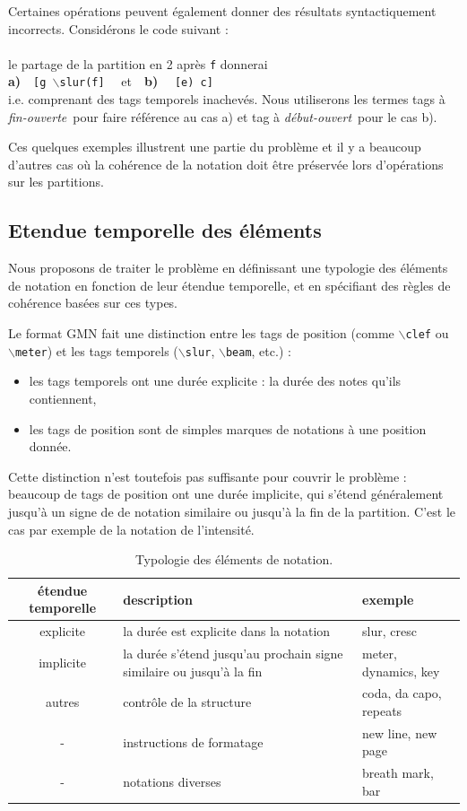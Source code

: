\documentclass{article}
\newcommand{\code}[1]		{{\small \texttt{#1}}}
\newcommand{\gtag}[1]		{$\backslash$\code{#1}}
\newcommand{\oend}			{\emph{fin-ouverte}}
\newcommand{\obeg}			{\emph{début-ouvert}}
\newcommand{\codeindent}	{\\ \hspace*{9mm}}
\begin{document}
Certaines opérations peuvent également donner des résultats syntactiquement incorrects. Considérons le code suivant :
\codeindent \code{[g \gtag{slur}(f e) c]} \\
le partage de la partition en 2 après \code{f} donnerai 
\codeindent \textbf{a)}\ \ \code{[g \gtag{slur}(f]} \ \  et\ \ \textbf{b)} \ \  \code{[e) c]} \\
i.e. comprenant des tags temporels inachevés. Nous utiliserons les termes tags à \oend\ pour faire référence au cas a) et tag à \obeg\ pour le cas b).

Ces quelques exemples illustrent une partie du problème et il y a beaucoup d'autres cas où la cohérence de la notation doit être préservée lors d'opérations sur les partitions.

\subsection{Etendue temporelle des éléments}
Nous proposons de traiter le problème en définissant une typologie des éléments de notation en fonction de leur étendue temporelle, et en spécifiant des règles de cohérence basées sur ces types.

Le format GMN fait une distinction entre les tags de position (comme \gtag{clef} ou \gtag{meter}) et les tags temporels (\gtag{slur}, \gtag{beam}, etc.) : 
\begin{itemize}
\item les tags temporels ont une durée explicite : la durée des notes qu'ils contiennent, 
\item les tags de position sont de simples marques de notations à une position donnée. 
\end{itemize}
Cette distinction n'est toutefois pas suffisante pour couvrir le problème : beaucoup de tags de position ont une durée implicite, qui s'étend généralement jusqu'à un signe de de notation similaire ou jusqu'à la fin de la partition. C'est le cas par exemple de la notation de l'intensité.
\begin{table}[htdp]
\begin{center}
\begin{tabular}{cll}
étendue temporelle & description & exemple \\
\hline
explicite 	& la durée est explicite dans la notation	& slur, cresc \\
implicite 	& la durée s'étend jusqu'au prochain signe similaire ou jusqu'à la fin	& meter, dynamics, key \\
autres 		& contrôle de la structure			& coda, da capo, repeats\\
	- 		& instructions	 de formatage 	& new line, new page \\
	- 		& notations diverses & breath mark, bar \\
\hline
\end{tabular}
\end{center}
\caption{Typologie des éléments de notation.}
\label{types}
\end{table}
\end{document}
